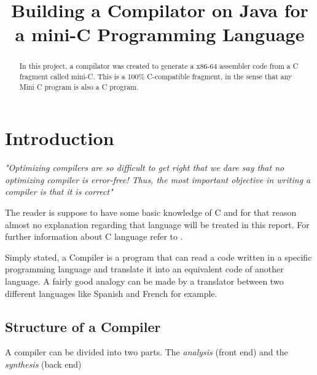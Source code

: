 \documentclass[conference]{IEEEtran}
\begin{document}
\title{Building a Compilator on Java for a mini-C Programming Language}

\author{
\and
{}
}
\maketitle

\tableofcontents
\newpage

\begin{abstract}
In this project, a compilator was created to generate a x86-64 assembler code from a C fragment called mini-C.
This is a 100\% C-compatible fragment, in the sense that any Mini C program is also a C program. 
\end{abstract}

\IEEEpeerreviewmaketitle

\section{Introduction}
\textit{"Optimizing compilers are so difficult to get right that we dare say that no optimizing compiler is error-free! Thus, the most important objective in writing a compiler is that it is correct"}\cite{DRAGON_BOOK}

The reader is suppose to have some basic knowledge of C and for that reason almost no explanation regarding that language will be treated in this report. For further information about C language refer to \cite{LANGUAGE_C}.

Simply stated, a Compiler is a program that can read a code written in a specific programming language and translate it into an equivalent code of another language. A fairly good analogy can be made by a translator between two different languages like Spanish and French for example.

\subsection{Structure of a Compiler}\label{sub_structure_of_a_compiler}

A compiler can be divided into two parts. The \textit{analysis} (front end) and the \textit{synthesis} (back end)
\end{document}
